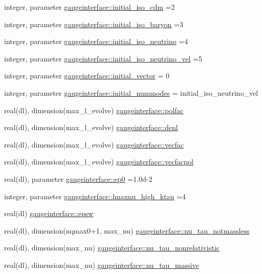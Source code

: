 \begin{DoxyCompactItemize}
\item 
integer, parameter \mbox{\hyperlink{namespacegaugeinterface_aab102b09528270be73847e43bc4ea5ab}{gaugeinterface\+::initial\+\_\+iso\+\_\+cdm}} =2
\item 
integer, parameter \mbox{\hyperlink{namespacegaugeinterface_aa3aaa16f51217e9cada87f670d1a2ae6}{gaugeinterface\+::initial\+\_\+iso\+\_\+baryon}} =3
\item 
integer, parameter \mbox{\hyperlink{namespacegaugeinterface_adbaabf824bb924de7518b623ffd8c9e3}{gaugeinterface\+::initial\+\_\+iso\+\_\+neutrino}} =4
\item 
integer, parameter \mbox{\hyperlink{namespacegaugeinterface_a47175df2f7681cf8e8a2a7e2cb94952a}{gaugeinterface\+::initial\+\_\+iso\+\_\+neutrino\+\_\+vel}} =5
\item 
integer, parameter \mbox{\hyperlink{namespacegaugeinterface_a540c4e4d2e1dea17aeb55e137acb0218}{gaugeinterface\+::initial\+\_\+vector}} = 0
\item 
integer, parameter \mbox{\hyperlink{namespacegaugeinterface_a4c1f07aacc342a123210732254937539}{gaugeinterface\+::initial\+\_\+nummodes}} = initial\+\_\+iso\+\_\+neutrino\+\_\+vel
\item 
real(dl), dimension(max\+\_\+l\+\_\+evolve) \mbox{\hyperlink{namespacegaugeinterface_a6e217a5a543d2b9517624820de0e3338}{gaugeinterface\+::polfac}}
\item 
real(dl), dimension(max\+\_\+l\+\_\+evolve) \mbox{\hyperlink{namespacegaugeinterface_ad67d0af8f042d5a80e3890d8a794be5f}{gaugeinterface\+::denl}}
\item 
real(dl), dimension(max\+\_\+l\+\_\+evolve) \mbox{\hyperlink{namespacegaugeinterface_adc490d2cf60b4b4224f782920c48141a}{gaugeinterface\+::vecfac}}
\item 
real(dl), dimension(max\+\_\+l\+\_\+evolve) \mbox{\hyperlink{namespacegaugeinterface_ae0aebf1ba68b305cd9abbe8bf79353d9}{gaugeinterface\+::vecfacpol}}
\item 
real(dl), parameter \mbox{\hyperlink{namespacegaugeinterface_ac46c357baba62f4aeaaec10b492d6e80}{gaugeinterface\+::ep0}} =1.\+0d-\/2
\item 
integer, parameter \mbox{\hyperlink{namespacegaugeinterface_a55cb8dcd9b184efebb1f82f7dbd5bf19}{gaugeinterface\+::lmaxnu\+\_\+high\+\_\+ktau}} =4
\item 
real(dl) \mbox{\hyperlink{namespacegaugeinterface_a7958da73f55e60b6e679c0a7f70ec822}{gaugeinterface\+::epsw}}
\item 
real(dl), dimension(nqmax0+1, max\+\_\+nu) \mbox{\hyperlink{namespacegaugeinterface_a041cc4df547c2fb25f42679b34de4891}{gaugeinterface\+::nu\+\_\+tau\+\_\+notmassless}}
\item 
real(dl), dimension(max\+\_\+nu) \mbox{\hyperlink{namespacegaugeinterface_aa6ec574b0c9183eb8881d0ed0376740c}{gaugeinterface\+::nu\+\_\+tau\+\_\+nonrelativistic}}
\item 
real(dl), dimension(max\+\_\+nu) \mbox{\hyperlink{namespacegaugeinterface_aecf1aff36254ca033f48a9a0bcf5416c}{gaugeinterface\+::nu\+\_\+tau\+\_\+massive}}
\end{DoxyCompactItemize}



